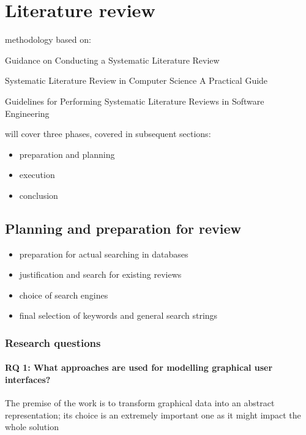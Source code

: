 \section{Literature review}\label{sec:literature-review}

methodology based on:


Guidance on Conducting a Systematic Literature Review~\cite{xiao_guidance_2019}

Systematic Literature Review in Computer Science \textendash A Practical Guide~\cite{neiva_systematic_2016}

Guidelines for Performing Systematic Literature Reviews in Software Engineering~\cite{kitchenham_guidelines_2007}

will cover three phases, covered in subsequent sections:
\begin{itemize}
    \item preparation and planning
    \item execution
    \item conclusion
\end{itemize}

\subsection[Planning and preparation]{Planning and preparation for review}\label{subsec:planning-and-preparation-for-review}

\begin{itemize}
    \item preparation for actual searching in databases
    \item justification and search for existing reviews
    \item choice of search engines
    \item final selection of keywords and general search strings
\end{itemize}

\subsubsection{Research questions}

\paragraph{RQ 1: What approaches are used for modelling graphical user interfaces?}
The premise of the work is to transform graphical data into an abstract representation;
its choice is an extremely important one as it might impact the whole solution

